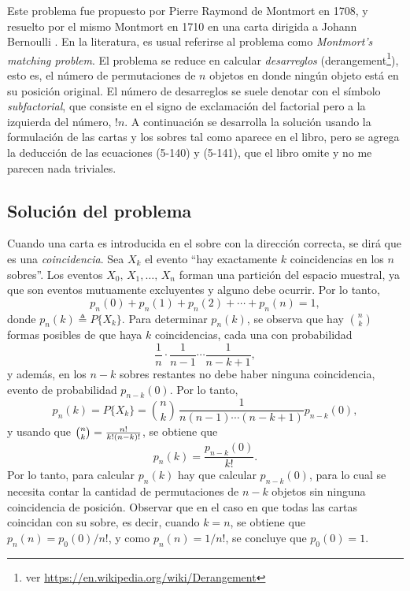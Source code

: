 \documentclass[a4paper]{report}
\begin{document}
Este problema fue propuesto por Pierre Raymond de Montmort en 1708, y resuelto por el mismo Montmort en 1710 en una carta dirigida a Johann Bernoulli \cite{takacs1980problem}. En la literatura, es usual referirse al problema como \emph{Montmort's matching problem}. El problema se reduce en calcular \emph{desarreglos} (derangement\footnote{ver \url{https://en.wikipedia.org/wiki/Derangement}}), esto es, el número de permutaciones de \(n\) objetos en donde ningún objeto está en su posición original. El número de desarreglos se suele denotar con el símbolo \emph{subfactorial}, que consiste en el signo de exclamación del factorial pero a la izquierda del número, \(!n\). A continuación se desarrolla la solución usando la formulación de las cartas y los sobres tal como aparece en el libro, pero se agrega la deducción de las ecuaciones (5-140) y (5-141), que el libro omite y no me parecen nada triviales.

\subsection{Solución del problema}

Cuando una carta es introducida en el sobre con la dirección correcta, se dirá que es una \emph{coincidencia}. Sea \(X_k\) el evento ``hay exactamente \(k\) coincidencias en los \(n\) sobres''. Los eventos \(X_0,\,X_1,\dots,\,X_n\) forman una partición del espacio muestral, ya que son eventos mutuamente excluyentes y alguno debe ocurrir. Por lo tanto,
\begin{equation}\label{eq:match_total_probability}
 p_n(0)+p_n(1)+p_n(2)+\cdots+p_n(n)=1,
\end{equation}
donde \(p_n(k)\triangleq P\{X_k\}\). Para determinar \(p_n(k)\), se observa que hay \(\binom{n}{k}\) formas posibles de que haya \(k\) coincidencias, cada una con probabilidad
\[
 \frac{1}{n}\cdot\frac{1}{n-1}\cdots\frac{1}{n-k+1},
\]
y además, en los \(n-k\) sobres restantes no debe haber ninguna coincidencia, evento de probabilidad \(p_{n-k}(0)\). Por lo tanto,
\[
 p_n(k)=P\{X_k\}=\binom{n}{k}\,\frac{1}{n(n-1)\cdots(n-k+1)}p_{n-k}(0),
\]
y usando que \(\binom{n}{k}=\displaystyle\textstyle {\frac{n!}{k!(n-k)!}}\), se obtiene que
\begin{equation}\label{eq:match_pnk1}
 p_n(k) = \frac{p_{n-k}(0)}{k!}.
\end{equation}
Por lo tanto, para calcular \(p_n(k)\) hay que calcular \(p_{n-k}(0)\), para lo cual se necesita contar la cantidad de permutaciones de \(n-k\) objetos sin ninguna coincidencia de posición. Observar que en el caso en que todas las cartas coincidan con su sobre, es decir, cuando \(k=n\), se obtiene que \(p_n(n)=p_0(0)/n!\), y como \(p_n(n)=1/n!\), se concluye que \(p_0(0)=1\). 
\end{document}
